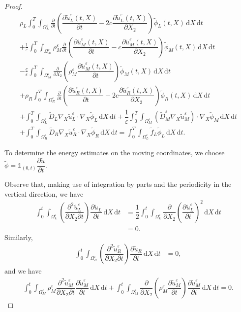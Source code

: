 \documentclass[11pt]{article}
\def\es{\varepsilon}
\def\orr{\Omega_R^\varepsilon}
\def\omm{\Omega_M^\varepsilon}
\def\oll{\Omega_L^\varepsilon}
\def\p{\partial}
\newcommand{\di}[1]{\,\mathrm{d}#1}
\begin{document}
\begin{proof}
\begin{multline*}
    \rho_L\int_0^T\int_{\oll} \frac{\p}{\p t}\left(\dfrac{\partial \widetilde{u}_{L}^\es(t,X)}{\partial t}-2c\dfrac{\partial \widetilde{u}_{L}^\es(t,X)}{\partial{X_2}}\right) \widetilde{\phi}_{L}(t,X)\di{X}\di{t}\\
     +\frac{1}{\es}\int_0^T\int_{\omm}\rho_M^\es \frac{\p}{\p t}\left(\dfrac{\partial \widetilde{u}_{M}^\es(t,X)}{\partial t}-c\dfrac{\partial \widetilde{u}_{M}^\es(t,X)}{\partial{X_2}}\right)\widetilde{\phi}_{M}(t,X)\di{X}\di{t}\\
     -\frac{c}{\es}\int_0^T\int_{\omm} \frac{\p}{\p X_2}\left(\rho_M^\es \dfrac{\partial \widetilde{u}_{M}^\es(t,X)}{\partial{t}}\right)\widetilde{\phi}_{M}(t,X)\di{X}\di{t}\\
      +\rho_R\int_0^T\int_{\orr}\frac{\p}{\p t} \left(\dfrac{\partial \widetilde{u}_{R}^\es(t,X)}{\partial t}-2c\dfrac{\partial \widetilde{u}_{R}^\es(t,X)}{\partial{X_2}}\right) \widetilde{\phi}_{R}(t,X)\di{X\di{t}}\\
       +\int_0^T\int_{\oll}\widetilde{D}_L\nabla_X \widetilde{u}_L^\es\cdot\nabla_X  \widetilde{\phi}_L \di{X}\di{t}+\dfrac{1}{\es}\int_0^T\int_{\omm}\left(\widetilde{D}_M^\es\nabla_X \widetilde{u}_M^\es\right)\cdot\nabla_X  \widetilde{\phi}_M\di{X}\di{t}\\
        +\int_0^T\int_{\orr} \widetilde{D}_R\nabla_X \widetilde{u}_R^\es\cdot\nabla_X  \widetilde{\phi}_R \di{X}\di{t}=\int_0^T\int_{\oll}\widetilde{f}_L \widetilde{\phi}_L\di{X}\di{t}.
\end{multline*}





To determine the energy estimates on the moving coordinates, we choose $\widetilde{\phi}=\mathds{1}_{(0,t)}\dfrac{\p \widetilde{u}}{\p t}$. 




Observe that, making use of integration by parts and the periodicity in the vertical direction, we have 
\begin{align*}
    \int_0^t\int_{\oll}\left(\dfrac{\p^2\widetilde{u}_{L}^\es}{\p X_2\p t} \right) \dfrac{\p \widetilde{u}_L}{\p t} \di{X}\di{t}&=\dfrac{1}{2}\int_0^t\int_{\oll} \dfrac{\p}{\p X_2} \left(\dfrac{\p \widetilde{u}_L^\es}{\p t}\right)^2\di{X}\di{t}\\
    &=0.
\end{align*}
Similarly,
\begin{align*}
    \int_0^t \int_{\orr}\left(\dfrac{\p^2\widetilde{u}_{R}^\es}{\p X_2\p t} \right) \dfrac{\p \widetilde{u}_R}{\p t} \di{X}\di{t}&=0,
\end{align*}
and we have
\begin{align*}
   \int_0^t\int_{\omm}\rho_M^\es \dfrac{\p^2\widetilde{u}_{M}^\es}{\p X_2\p t}\dfrac{\p \widetilde{u}_{M}^\es}{\p t} \di{X}\di{t}+ \int_0^t\int_{\omm}\dfrac{\p}{\p X_2}\left(\rho_M^\es\dfrac{\p \widetilde{u}_M^\es}{\p t}\right)\dfrac{\p \widetilde{u}_{M}^\es}{\p t} \di{X}\di{t}=0.
\end{align*}


\end{proof}
\end{document}
